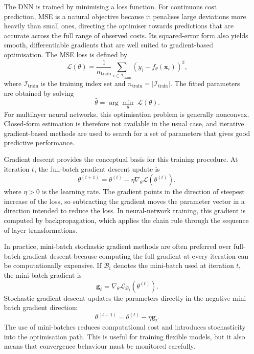 \noindent
The DNN is trained by minimising a loss function. For continuous cost
prediction, MSE is a natural objective because it penalises large
deviations more heavily than small ones, directing the optimiser towards
predictions that are accurate across the full range of observed costs.
Its squared-error form also yields smooth, differentiable gradients that
are well suited to gradient-based optimisation.  The MSE loss is
defined by
\begin{equation}
\label{eq:mse_loss}
    \mathcal{L}(\theta)
    =
    \frac{1}{n_{\mathrm{train}}}
    \sum_{i\in\mathcal{I}_{\mathrm{train}}}
    \left(
        y_i
        -
        f_{\theta}(\mathbf{x}_i)
    \right)^2,
\end{equation}
where \(\mathcal{I}_{\mathrm{train}}\) is the training index set and
\(n_{\mathrm{train}}=|\mathcal{I}_{\mathrm{train}}|\). The fitted parameters are
obtained by solving
\begin{equation}
\label{eq:fitted_params}
    \widehat{\theta}
    =
    \arg\min_{\theta}
    \;
    \mathcal{L}(\theta).
\end{equation}
For multilayer neural networks, this optimisation problem is generally
nonconvex. Closed-form estimation is therefore not available in the usual
case, and iterative gradient-based methods are used to search for a set of
parameters that gives good predictive performance.

\noindent
Gradient descent provides the conceptual basis for this training procedure. At
iteration \(t\), the full-batch gradient descent update is
\[
    \theta^{(t+1)}
    =
    \theta^{(t)}
    -
    \eta
    \nabla_{\theta}
    \mathcal{L}
    \!\left(
        \theta^{(t)}
    \right),
\]
where \(\eta>0\) is the learning rate. The gradient points in the direction of
steepest increase of the loss, so subtracting the gradient moves the parameter
vector in a direction intended to reduce the loss. In neural-network training,
this gradient is computed by backpropagation, which applies the chain rule
through the sequence of layer transformations.

\noindent
In practice, mini-batch stochastic gradient methods are often preferred over
full-batch gradient descent because computing the full gradient at every
iteration can be computationally expensive. If \(\mathcal{B}_{t}\) denotes the
mini-batch used at iteration \(t\), the mini-batch gradient is
\[
    \mathbf{g}_{t}
    =
    \nabla_{\theta}
    \mathcal{L}_{\mathcal{B}_{t}}
    \!\left(
        \theta^{(t)}
    \right).
\]
Stochastic gradient descent updates the parameters directly in the negative
mini-batch gradient direction:
\[
    \theta^{(t+1)}
    =
    \theta^{(t)}
    -
    \eta\mathbf{g}_{t}.
\]
The use of mini-batches reduces computational cost and introduces stochasticity
into the optimisation path. This is useful for training flexible models, but it
also means that convergence behaviour must be monitored carefully.

